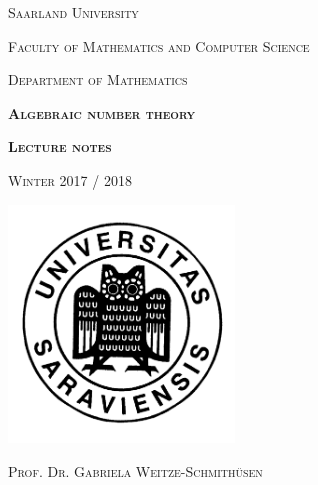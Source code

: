 \documentclass[a4paper, fontsize=11pt]{scrartcl}
\begin{document}
\pagestyle{empty}
\begin{center}

{\scshape\large Saarland University}

\smallskip
{\scshape\large Faculty of Mathematics and Computer Science}

\smallskip
{\scshape\large Department of Mathematics}

\vspace{20mm}

{\scshape\Huge\bfseries Algebraic number theory
}

\vspace{12mm}


{\scshape\bfseries\LARGE Lecture notes}

\vspace{2mm}

{\scshape\large Winter 2017 / 2018}


\vfill
\centerline{\mbox{\includegraphics[width=60mm]{../img/universitas.png}}}

\vfill




\vspace{15mm}


{\scshape\huge Prof. Dr. Gabriela Weitze-Schmithüsen}


\vfill


\end{center}
\end{document}
